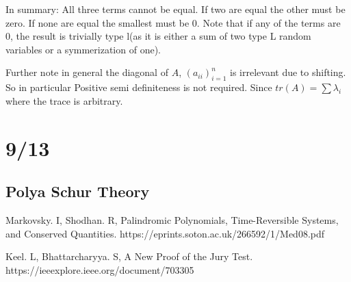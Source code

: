 \documentclass[10pt]{article}
\newcommand{\1}{\textbf{1}}
\theoremstyle{remark}
\theoremstyle{definition}
\begin{document}
In summary: All three terms cannot be equal. If two are equal the other must be zero. If none are equal the smallest must be 0. Note that if any of the terms are 0, the result is trivially type l(as it is either a sum of two type L random variables or a symmerization of one).

Further note in general the diagonal of $A$, $(a_{ii})_{i=1}^n$ is irrelevant due to shifting. So in particular Positive semi definiteness is not required. Since $tr(A) = \sum \lambda_i$ where the trace is arbitrary.

\section{9/13}

\subsection{Polya Schur Theory}



\begin{thebibliography}{9}


 Markovsky. I, Shodhan. R,
Palindromic Polynomials, Time-Reversible Systems, and Conserved Quantities. https://eprints.soton.ac.uk/266592/1/Med08.pdf

 Keel. L, Bhattarcharyya. S,
A New Proof of the Jury Test. https://ieeexplore.ieee.org/document/703305

\end{thebibliography}
\end{document}
